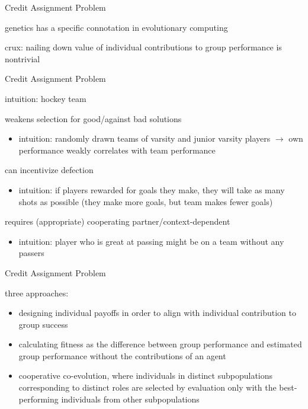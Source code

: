 \begin{frame}{Credit Assignment Problem}

genetics has a specific connotation in evolutionary computing

crux: nailing down value of individual contributions to group performance is nontrivial \cite{panait2005cooperative}

\end{frame}

\begin{frame}{Credit Assignment Problem}

intuition: hockey team

weakens selection for good/against bad solutions
\begin{itemize}
\item intuition: randomly drawn teams of varsity and junior varsity players $\rightarrow$ own performance weakly correlates with team performance
\end{itemize}

can incentivize defection
\begin{itemize}
\item intuition: if players rewarded for goals they make, they will take as many shots as possible (they make more goals, but team makes fewer goals)
\end{itemize}

requires (appropriate) cooperating partner/context-dependent
\begin{itemize}
\item intuition: player who is great at passing might be on a team without any passers
\end{itemize}

\end{frame}

\begin{frame}{Credit Assignment Problem}

three approaches:
\begin{itemize}
\item designing individual payoffs in order to align with individual contribution to group success \cite{waibel2009genetic}
\item calculating fitness as the difference between group performance and estimated group performance without the contributions of an agent \cite{knudson2010coevolution}
\item cooperative co-evolution, where individuals in distinct subpopulations corresponding to distinct roles are selected by evaluation only with the best-performing individuals from other subpopulations \cite{gomes2015cooperative}
\end{itemize}

\end{frame}

